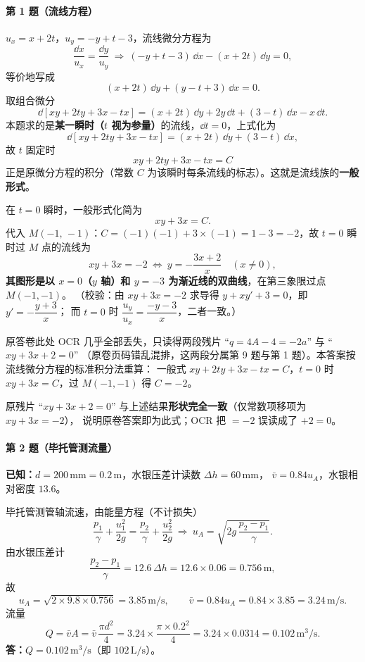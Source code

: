 \paragraph{第 1 题（流线方程）}
\begin{jie}
$u_x=x+2t$，$u_y=-y+t-3$，流线微分方程为
\[
\frac{\dd x}{u_x}=\frac{\dd y}{u_y}\ \Longrightarrow\
(-y+t-3)\,\dd x-(x+2t)\,\dd y=0 ,
\]
等价地写成
\[
(x+2t)\,\dd y+(y-t+3)\,\dd x=0 .
\]
取组合微分
\[
\dd\!\left[xy+2ty+3x-tx\right]
=(x+2t)\,\dd y+2y\,\dd t+(3-t)\,\dd x-x\,\dd t .
\]
本题求的是\textbf{某一瞬时（$t$ 视为参量）}的流线，$\dd t=0$，上式化为
\[
\dd\!\left[xy+2ty+3x-tx\right]=(x+2t)\,\dd y+(3-t)\,\dd x ,
\]
故 $t$ 固定时
\[
xy+2ty+3x-tx=C
\]
正是原微分方程的积分（常数 $C$ 为该瞬时每条流线的标志）。这就是流线族的\textbf{一般形式}。

在 $t=0$ 瞬时，一般形式化简为
\[
xy+3x=C .
\]
代入 $M(-1,\,-1)$：$C=(-1)(-1)+3\times(-1)=1-3=-2$，故 $t=0$ 瞬时过 $M$ 点的流线为
\[
xy+3x=-2\ \Longleftrightarrow\ y=-\frac{3x+2}{x}\quad(x\neq0),
\]
\textbf{其图形是以 $x=0$（$y$ 轴）和 $y=-3$ 为渐近线的双曲线}，在第三象限过点 $M(-1,-1)$。
（校验：由 $xy+3x=-2$ 求导得 $y+xy'+3=0$，即 $y'=-\dfrac{y+3}{x}$；
而 $t=0$ 时 $\dfrac{u_y}{u_x}=\dfrac{-y-3}{x}$，二者一致。）
\end{jie}

\begin{tishi}
原答卷此处 OCR 几乎全部丢失，只读得两段残片 ``$q=4A-4=-2a$'' 与 ``$xy+3x+2=0$''
（原卷页码错乱混排，这两段分属第 9 题与第 1 题）。本答案按流线微分方程的标准积分法重算：
一般式 $xy+2ty+3x-tx=C$，$t=0$ 时 $xy+3x=C$，过 $M(-1,-1)$ 得 $C=-2$。

原残片 ``$xy+3x+2=0$'' 与上述结果\textbf{形状完全一致}（仅常数项移项为 $xy+3x=-2$），
说明原卷答案即为此式；OCR 把 $=-2$ 误读成了 $+2=0$。
\end{tishi}

\paragraph{第 2 题（毕托管测流量）}
\begin{jie}
\textbf{已知：}$d=200\,\mathrm{mm}=0.2\,\mathrm{m}$，水银压差计读数 $\Delta h=60\,\mathrm{mm}$，
$\bar v=0.84u_A$，水银相对密度 $13.6$。

毕托管测管轴流速，由能量方程（不计损失）
\[
\frac{p_1}{\gamma}+\frac{u_1^2}{2g}=\frac{p_2}{\gamma}+\frac{u_2^2}{2g}
\ \Longrightarrow\
u_A=\sqrt{2g\,\frac{p_2-p_1}{\gamma}} .
\]
由水银压差计
\[
\frac{p_2-p_1}{\gamma}=12.6\,\Delta h=12.6\times0.06=0.756\,\mathrm{m},
\]
故
\[
u_A=\sqrt{2\times9.8\times0.756}=3.85\,\mathrm{m/s},\qquad
\bar v=0.84u_A=0.84\times3.85=3.24\,\mathrm{m/s}.
\]
流量
\[
Q=\bar v A=\bar v\,\frac{\pi d^{2}}{4}=3.24\times\frac{\pi\times0.2^{2}}{4}
=3.24\times0.0314=0.102\,\mathrm{m^{3}/s}.
\]
\textbf{答：}$Q=0.102\,\mathrm{m^3/s}$（即 $102\,\mathrm{L/s}$）。
\end{jie}

